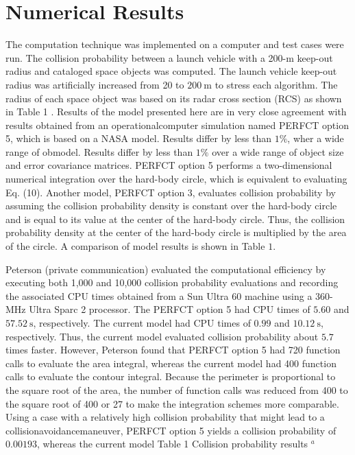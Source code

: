 \documentclass[10pt]{article}
\begin{document}
\section{Numerical Results}
The computation technique was implemented on a computer and test cases were run. The collision probability between a launch vehicle with a 200-m keep-out radius and cataloged space objects was computed. The launch vehicle keep-out radius was artificially increased from 20 to $200 \mathrm{~m}$ to stress each algorithm. The radius of each space object was based on its radar cross section (RCS) as shown in Table 1 . Results of the model presented here are in very close agreement with results obtained from an operationalcomputer simulation named PERFCT option 5, which is based on a NASA model. Results differ by less than $1 \%$, wher a wide range of obmodel. Results differ by less than $1 \%$ over a wide range of object size and error covariance matrices. PERFCT option 5 performs a two-dimensional numerical integration over the hard-body circle, which is equivalent to evaluating Eq. (10). Another model, PERFCT option 3, evaluates collision probability by assuming the collision probability density is constant over the hard-body circle and is equal to its value at the center of the hard-body circle. Thus, the collision probability density at the center of the hard-body circle is multiplied by the area of the circle. A comparison of model results is shown in Table $1 .$

Peterson (private communication) evaluated the computational efficiency by executing both 1,000 and 10,000 collision probability evaluations and recording the associated CPU times obtained from a Sun Ultra 60 machine using a 360-MHz Ultra Sparc 2 processor. The PERFCT option 5 had CPU times of $5.60$ and $57.52 \mathrm{~s}$, respectively. The current model had CPU times of $0.99$ and $10.12 \mathrm{~s}$, respectively. Thus, the current model evaluated collision probability about $5.7$ times faster. However, Peterson found that PERFCT option 5 had 720 function calls to evaluate the area integral, whereas the current model had 400 function calls to evaluate the contour integral. Because the perimeter is proportional to the square root of the area, the number of function calls was reduced from 400 to the square root of 400 or 27 to make the integration schemes more comparable. Using a case with a relatively high collision probability that might lead to a collisionavoidancemaneuver, PERFCT option 5 yields a collision probability of $0.00193$, whereas the current model Table 1 Collision probability results ${ }^{a}$
\end{document}
